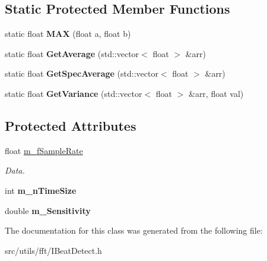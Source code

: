 \subsection*{Static Protected Member Functions}
\begin{DoxyCompactItemize}
\item 
\mbox{\label{class_i_beat_detect_a739114e0fbc6715495c1e84c69929d99}} 
static float {\bfseries M\+AX} (float a, float b)
\item 
\mbox{\label{class_i_beat_detect_ad80da1815f7e78daf2c7543a9639b2ef}} 
static float {\bfseries Get\+Average} (std\+::vector$<$ float $>$ \&arr)
\item 
\mbox{\label{class_i_beat_detect_a3b031ad4392d3afc5b7f93b6d6c6cf07}} 
static float {\bfseries Get\+Spec\+Average} (std\+::vector$<$ float $>$ \&arr)
\item 
\mbox{\label{class_i_beat_detect_a2d14939826cdcb3dfaa64bfac03d2341}} 
static float {\bfseries Get\+Variance} (std\+::vector$<$ float $>$ \&arr, float val)
\end{DoxyCompactItemize}
\subsection*{Protected Attributes}
\begin{DoxyCompactItemize}
\item 
\mbox{\label{class_i_beat_detect_a85d8fecbec38e16275fbc3c843806098}} 
float \hyperlink{class_i_beat_detect_a85d8fecbec38e16275fbc3c843806098}{m\+\_\+f\+Sample\+Rate}
\begin{DoxyCompactList}\small\item\em Data. \end{DoxyCompactList}\item 
\mbox{\label{class_i_beat_detect_aea58939e318524cddf721df7e385874f}} 
int {\bfseries m\+\_\+n\+Time\+Size}
\item 
\mbox{\label{class_i_beat_detect_a07c6a8693af40599e28c48f90bcaad0d}} 
double {\bfseries m\+\_\+\+Sensitivity}
\end{DoxyCompactItemize}


The documentation for this class was generated from the following file\+:\begin{DoxyCompactItemize}
\item 
src/utils/fft/I\+Beat\+Detect.\+h\end{DoxyCompactItemize}
